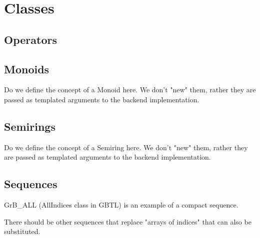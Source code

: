 \chapter{Classes}
\label{Chp:Classes}


\section{Operators}



\section{Monoids}

Do we define the concept of a Monoid here.  We don't "new" them, rather they
are passed as templated arguments to the backend implementation.




\section{Semirings}

Do we define the concept of a Semiring here.  We don't "new" them, rather they
are passed as templated arguments to the backend implementation.



\section{Sequences}
\label{Sec:Sequences}

{\sf GrB\_ALL} (AllIndices class in GBTL) is an example of a compact sequence.

There should be other sequences that replace "arrays of indices" that can also be substituted.

